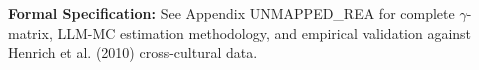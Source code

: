 \begin{cross-reference}
\textbf{Formal Specification:} See Appendix UNMAPPED_REA for complete $\gamma$-matrix, 
LLM-MC estimation methodology, and empirical validation against 
Henrich et al. (2010) cross-cultural data.
\end{cross-reference}

